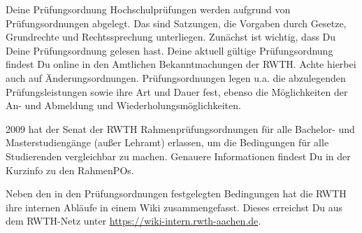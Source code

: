 \begin{artikel}{Deine Prüfungsordnung}
Hochschulprüfungen werden aufgrund von Prüfungsordnungen abgelegt. Das sind Satzungen, die Vorgaben durch Gesetze, Grundrechte und Rechtssprechung unterliegen. Zunächst ist wichtig, dass Du Deine Prüfungsordnung gelesen hast. Deine aktuell gültige Prüfungsordnung findest Du online in den Amtlichen Bekanntmachungen der RWTH. Achte hierbei auch auf Änderungsordnungen. Prüfungsordnungen legen u.a. die abzulegenden Prüfungsleistungen sowie ihre Art und Dauer fest, ebenso die Möglichkeiten der An- und Abmeldung und Wiederholungsmöglichkeiten.

2009 hat der Senat der RWTH Rahmenprüfungsordnungen für alle Bachelor- und Masterstudiengänge (außer Lehramt) erlassen, um die Bedingungen für alle Studierenden vergleichbar zu machen. Genauere Informationen findest Du in der Kurzinfo zu den RahmenPOs.

Neben den in den Prüfungsordnungen festgelegten Bedingungen hat die RWTH ihre internen Abläufe in einem Wiki zusammengefasst. Dieses erreichst Du aus dem RWTH-Netz unter \url{https://wiki-intern.rwth-aachen.de}.
\end{artikel}
